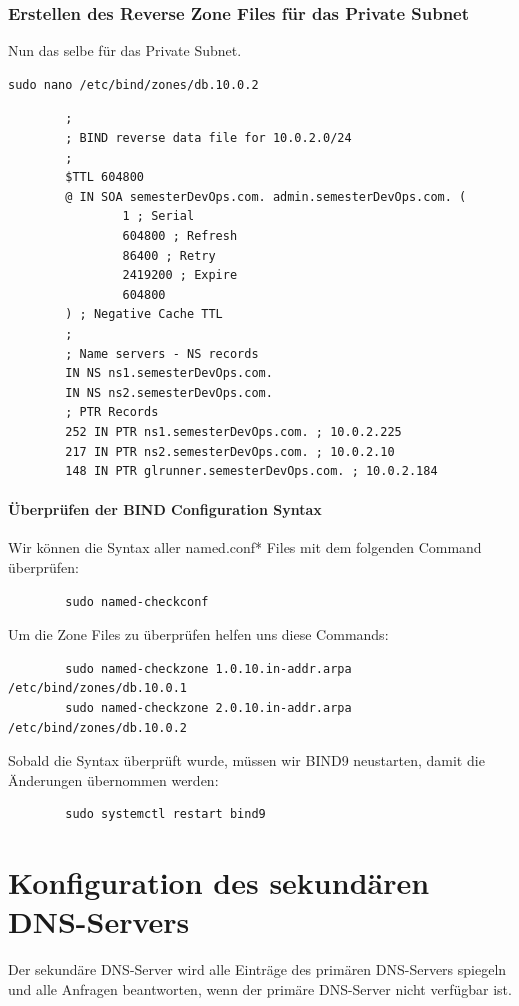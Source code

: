 \documentclass[a4paper,12pt]{article}
\begin{document}
\newpage

\subsubsection{Erstellen des Reverse Zone Files für das Private Subnet}
Nun das selbe für das Private Subnet.

\begin{verbatim}
sudo nano /etc/bind/zones/db.10.0.2
\end{verbatim}

\begin{verbatim}
		;
		; BIND reverse data file for 10.0.2.0/24
		;
		$TTL 604800
		@ IN SOA semesterDevOps.com. admin.semesterDevOps.com. (
				1 ; Serial 
				604800 ; Refresh
				86400 ; Retry
				2419200 ; Expire
				604800 
		) ; Negative Cache TTL
		;
		; Name servers - NS records
		IN NS ns1.semesterDevOps.com.
		IN NS ns2.semesterDevOps.com.
		; PTR Records
		252 IN PTR ns1.semesterDevOps.com. ; 10.0.2.225
		217 IN PTR ns2.semesterDevOps.com. ; 10.0.2.10
		148 IN PTR glrunner.semesterDevOps.com. ; 10.0.2.184
\end{verbatim}

\paragraph{Überprüfen der BIND Configuration Syntax}
Wir können die Syntax aller named.conf* Files mit dem folgenden Command überprüfen:

\begin{verbatim}
		sudo named-checkconf
\end{verbatim}
Um die Zone Files zu überprüfen helfen uns diese Commands:
\begin{verbatim}
		sudo named-checkzone 1.0.10.in-addr.arpa /etc/bind/zones/db.10.0.1
		sudo named-checkzone 2.0.10.in-addr.arpa /etc/bind/zones/db.10.0.2
\end{verbatim}
Sobald die Syntax überprüft wurde, müssen wir BIND9 neustarten, damit die Änderungen übernommen werden:
\begin{verbatim}
		sudo systemctl restart bind9
\end{verbatim}

\section{Konfiguration des sekundären DNS-Servers}  
Der sekundäre DNS-Server wird alle Einträge des primären DNS-Servers spiegeln 
und alle Anfragen beantworten, wenn der primäre DNS-Server nicht verfügbar ist.  
\end{document}
